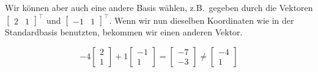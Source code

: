 Wir können aber auch eine andere Basis wählen, z.B.\ gegeben durch die Vektoren \( \begin{bmatrix} 2 & 1 \end{bmatrix}^\top \) und \( \begin{bmatrix} -1 & 1 \end{bmatrix}^\top \). Wenn wir nun dieselben Koordinaten wie in der Standardbasis benutzten, bekommen wir einen anderen Vektor. 

\begin{equation*}
    -4 \begin{bmatrix} 2 \\ 1 \end{bmatrix} + 1 \begin{bmatrix} -1 \\ 1 \end{bmatrix} = \begin{bmatrix} -7 \\ -3 \end{bmatrix} \neq \begin{bmatrix} -4 \\ 1 \end{bmatrix}
\end{equation*}

